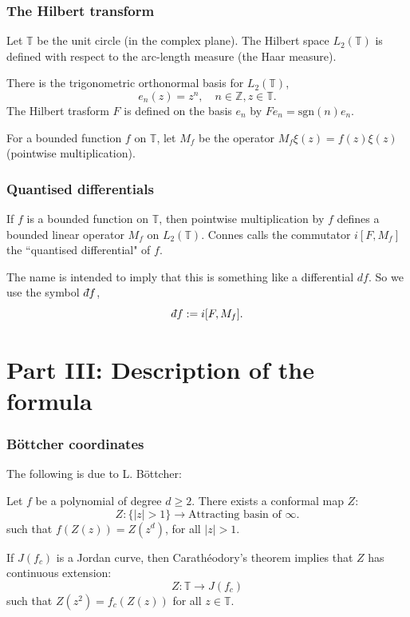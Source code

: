 \documentclass{beamer} %
\theoremstyle{definition} %
\newcommand{\Itgr}{\mathbb{Z}}
\newcommand{\Circ}{\mathbb{T}}
\newcommand{\sgn}{\mathrm{sgn}}
\def\qd{\,{\mathchar'26\mkern-12mu d}}
\begin{document}
\begin{frame}\frametitle{The Hilbert transform}
    Let $\Circ$ be the unit circle (in the complex plane). The Hilbert space $L_2(\Circ)$ is
    defined with respect to the arc-length measure (the Haar measure).
    
    There is the trigonometric orthonormal basis for $L_2(\Circ)$,
    \begin{equation*}
        e_n(z) = z^n,\quad n\in \Itgr, z \in \Circ.
    \end{equation*}
    The Hilbert trasform $F$ is defined on the basis $e_n$ by $Fe_n = \sgn(n)e_n$.
    
    For a bounded function $f$ on $\Circ$, let $M_f$ be the operator $M_f\xi(z) = f(z)\xi(z)$ (pointwise multiplication).
\end{frame}

\begin{frame}\frametitle{Quantised differentials}
    If $f$ is a bounded function on $\Circ$, then pointwise multiplication
    by $f$ defines a bounded linear operator $M_f$ on $L_2(\Circ)$. 
    Connes calls the commutator $i[F,M_f]$ the ``quantised differential" of $f$.
    
    The name is intended to imply that this is something like a differential $df$. So we use the symbol $\qd f$,
    \begin{equation*}
        \qd f := i[F,M_f].
    \end{equation*}
\end{frame}


\section{Part III: Description of the formula}

\begin{frame}\frametitle{B\"ottcher coordinates}
    
    The following is due to L. B\"ottcher:
    \begin{theorem}
        Let $f$ be a polynomial of degree $d \geq 2$. There exists a conformal map $Z$:
        \begin{equation*}
            Z:\{|z| > 1\}\to \text{Attracting basin of }\infty.
        \end{equation*}
        such that $f(Z(z)) = Z(z^d)$, for all $|z| > 1$.
    \end{theorem}
    If $J(f_c)$ is a Jordan curve, then Carath\'eodory's theorem implies that $Z$ has continuous extension:
    \begin{equation*}
        Z:\Circ\to J(f_c)
    \end{equation*}
    such that $Z(z^2) = f_c(Z(z))$ for all $z \in \Circ$.
\end{frame}
\end{document}
